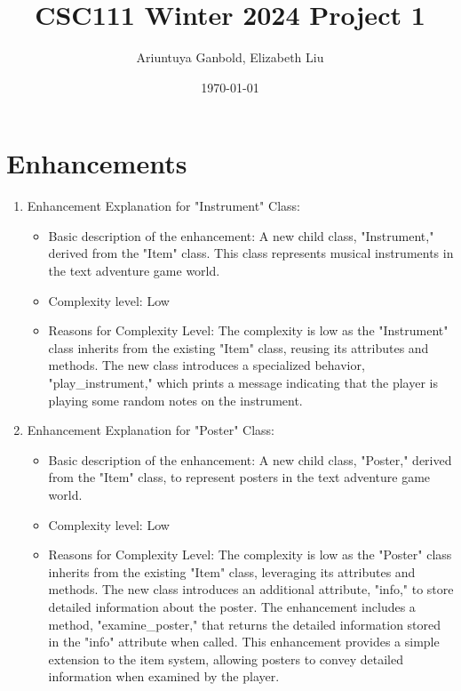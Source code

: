 \documentclass[11pt]{article}
\title{CSC111 Winter 2024 Project 1}
\author{Ariuntuya Ganbold, Elizabeth Liu }
\date{\today}
\begin{document}
\maketitle

\section*{Enhancements}


\begin{enumerate}

\item Enhancement Explanation for "Instrument" Class:

  \begin{itemize}
    \item Basic description of the enhancement: A new child class, "Instrument," derived from the "Item" class. This class represents musical instruments in the text adventure game world.

    \item Complexity level: Low

    \item Reasons for Complexity Level:
The complexity is low as the "Instrument" class inherits from the existing "Item" class, reusing its attributes and methods.
 The new class introduces a specialized behavior, "play\_instrument," which prints a message indicating that the player is playing some random notes on the instrument.

  \end{itemize}


\item Enhancement Explanation for "Poster" Class:

  \begin{itemize}
    \item Basic description of the enhancement: A new child class, "Poster," derived from the "Item" class, to represent posters in the text adventure game world.


    \item Complexity level: Low

    \item Reasons for Complexity Level:
 The complexity is low as the "Poster" class inherits from the existing "Item" class, leveraging its attributes and methods. The new class introduces an additional attribute, "info," to store detailed information about the poster. The enhancement includes a method, "examine\_poster," that returns the detailed information stored in the "info" attribute when called. This enhancement provides a simple extension to the item system, allowing posters to convey detailed information when examined by the player.


\end{itemize}
\end{enumerate}
\end{document}
